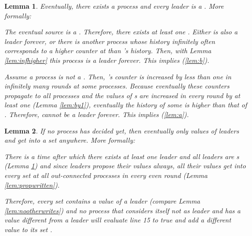 \documentclass[conference, compsoc]{IEEEtran}
\newtheorem{lemma}{Lemma}
\begin{document}
\begin{lemma} \label{lem:propmaximal}
Eventually, there exists a process  and every leader is a . More formally:
 
\begin{IEEEproof}
The eventual source  is a . Therefore, there exists at least one . Either  is also a leader forever, or there is another process whose history infinitely often corresponds to a higher counter at  than 's history. Then, with Lemma \ref{lem:infhigher} this process is a leader forever. This implies (\ref{lem:b}).


Assume a process  is not a . Then, 's counter is increased by less than one in infinitely many rounds at some processes. Because eventually these counters propagate to all   processes and the values of s are increased in every round by at least one (Lemma \ref{lem:by1}), eventually the history of some  is higher than that of . Therefore,  cannot be a leader forever. This implies (\ref{lem:a}).  

 
\end{IEEEproof}
\end{lemma}




\begin{lemma} \label{lem:nodifferent}
If no process has decided yet, then eventually only values of leaders and  get into a set  anywhere. More formally:

 \begin{IEEEproof}
 There is a time after which there exists at least one leader and all leaders are s (Lemma \ref{lem:propmaximal}) and since leaders propose their values always, all their values get into every set  at all out-connected processes in every even round (Lemma \ref{lem:propwritten}).
 
 Therefore, every set  contains a value of a leader (compare Lemma \ref{lem:nootherwrites}) and no process that considers itself not as leader and has a value different from a leader will evaluate line 15 to true and add a different value to its set .
 \end{IEEEproof} 
\end{lemma}
\end{document}
